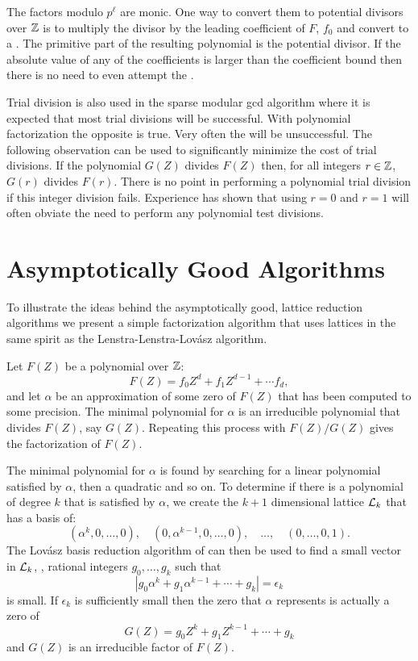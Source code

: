 The factors modulo $p^{\ell}$ are monic.  One way to convert them to
potential divisors over $\mathbb{Z}$ is to multiply the divisor by the leading
coefficient of $F$, $f_0$ and convert to a .  The primitive part of the resulting polynomial is the potential divisor.  If
the absolute value of any of the coefficients is larger than the
coefficient bound then there is no need to even attempt the
.

Trial division is also used in the sparse modular {\sc gcd}
algorithm where it is expected that most trial divisions will be
successful.  With polynomial factorization the opposite is true.
Very often the  will be unsuccessful.  The following
observation can be used to significantly minimize the cost of trial
divisions.  If the polynomial $G(Z)$ divides $F(Z)$ then,
for all integers $r \in \mathbb{Z}$, $G(r)$ divides $F(r)$.  There is no point
in performing a polynomial trial division if this integer division fails.
Experience has shown \cite{Abbot1985-xy} that using $r= 0$ and $r=1$ will
often obviate the need to perform any polynomial test divisions.

\section{Asymptotically Good Algorithms}
\label{UF:LLL:Sec}

To illustrate the ideas behind the asymptotically good, lattice
reduction algorithms we present a simple factorization algorithm that
uses lattices in the same spirit as the Lenstra-Lenstra-Lov\'asz
algorithm.

Let $F(Z)$ be a polynomial over $\mathbb{Z}$:
\[
F(Z) = f_0 Z^d + f_1 Z^{d-1} + \cdots f_d,
\]
and let $\alpha$ be an approximation of some zero of $F(Z)$ that has
been computed to some precision.  The minimal polynomial for $\alpha$
is an irreducible polynomial that divides $F(Z)$, say $G(Z)$.
Repeating this process with $F(Z)/G(Z)$ gives the factorization of
$F(Z)$.

The minimal polynomial for $\alpha$ is found by searching for a
linear polynomial satisfied by $\alpha$, then a quadratic and so on.
To determine if there is a polynomial of degree $k$ that is satisfied
by $\alpha$, we create the $k+1$ dimensional lattice ${\cal L}_k$ that
has a basis of:
\[
(\alpha^k, 0, \ldots, 0), \quad(0, \alpha^{k-1}, 0, \ldots, 0), 
\quad\ldots, \quad(0, \ldots, 0, 1).
\]
The Lov\'asz basis reduction algorithm of 
can then be used to find a small vector in ${\cal L}_k$, \ie, rational
integers $g_0, \ldots, g_k$ such that 
\[
\left|g_0 \alpha^k + g_1 \alpha^{k-1} + \cdots + g_k\right| =
\epsilon_k
\]
is small.  If $\epsilon_k$ is sufficiently small then the zero that
$\alpha$ represents is actually a zero of
\[
G(Z) = g_0 Z^k + g_1 Z^{k-1} + \cdots + g_k
\]
and $G(Z)$ is an irreducible factor of $F(Z)$.


